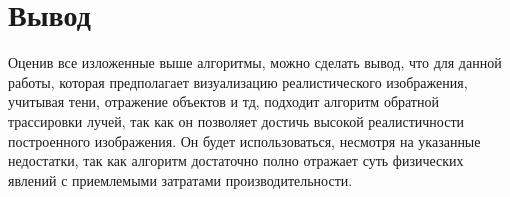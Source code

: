 \section {Вывод}

Оценив все изложенные выше алгоритмы, можно сделать вывод, что для данной работы, которая предполагает визуализацию реалистического изображения, учитывая тени, отражение объектов и тд, подходит алгоритм обратной трассировки лучей, так как он позволяет достичь высокой реалистичности построенного изображения. Он будет использоваться, несмотря на указанные недостатки, так как алгоритм достаточно полно отражает суть физических явлений с приемлемыми затратами производительности.



